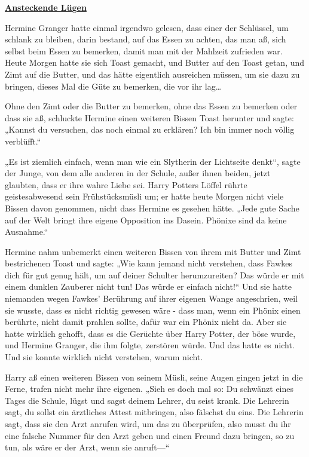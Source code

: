 

\hypertarget{ansteckende-luxfcgen}{%

\textbf{\uline{Ansteckende Lügen}}

Hermine Granger hatte einmal irgendwo gelesen, dass einer der Schlüssel, um schlank zu bleiben, darin bestand, auf das Essen zu achten, das man aß, sich selbst beim Essen zu bemerken, damit man mit der Mahlzeit zufrieden war. Heute Morgen hatte sie sich Toast gemacht, und Butter auf den Toast getan, und Zimt auf die Butter, und das hätte eigentlich ausreichen müssen, um sie dazu zu bringen, dieses Mal die Güte zu bemerken, die vor ihr lag…

Ohne den Zimt oder die Butter zu bemerken, ohne das Essen zu bemerken oder dass sie aß, schluckte Hermine einen weiteren Bissen Toast herunter und sagte: „Kannst du versuchen, das noch einmal zu erklären? Ich bin immer noch völlig verblüfft.“

„Es ist ziemlich einfach, wenn man wie ein Slytherin der Lichtseite denkt“, sagte der Junge, von dem alle anderen in der Schule, außer ihnen beiden, jetzt glaubten, dass er ihre wahre Liebe sei. Harry Potters Löffel rührte geistesabwesend sein Frühstücksmüsli um; er hatte heute Morgen nicht viele Bissen davon genommen, nicht dass Hermine es gesehen hätte. „Jede gute Sache auf der Welt bringt ihre eigene Opposition ins Dasein. Phönixe sind da keine Ausnahme.“

Hermine nahm unbemerkt einen weiteren Bissen von ihrem mit Butter und Zimt bestrichenen Toast und sagte: „Wie kann jemand nicht verstehen, dass Fawkes dich für gut genug hält, um auf deiner Schulter herumzureiten? Das würde er mit einem dunklen Zauberer nicht tun! Das würde er einfach nicht!“ Und sie hatte niemanden wegen Fawkes' Berührung auf ihrer eigenen Wange angeschrien, weil sie wusste, dass es nicht richtig gewesen wäre - dass man, wenn ein Phönix einen berührte, nicht damit prahlen sollte, dafür war ein Phönix nicht da. Aber sie hatte wirklich gehofft, dass es die Gerüchte über Harry Potter, der böse wurde, und Hermine Granger, die ihm folgte, zerstören würde. Und das hatte es nicht. Und sie konnte wirklich nicht verstehen, warum nicht.

Harry aß einen weiteren Bissen von seinem Müsli, seine Augen gingen jetzt in die Ferne, trafen nicht mehr ihre eigenen. „Sieh es doch mal so: Du schwänzt eines Tages die Schule, lügst und sagst deinem Lehrer, du seist krank. Die Lehrerin sagt, du sollst ein ärztliches Attest mitbringen, also fälschst du eins. Die Lehrerin sagt, dass sie den Arzt anrufen wird, um das zu überprüfen, also musst du ihr eine falsche Nummer für den Arzt geben und einen Freund dazu bringen, so zu tun, als wäre er der Arzt, wenn sie anruft—“

}
